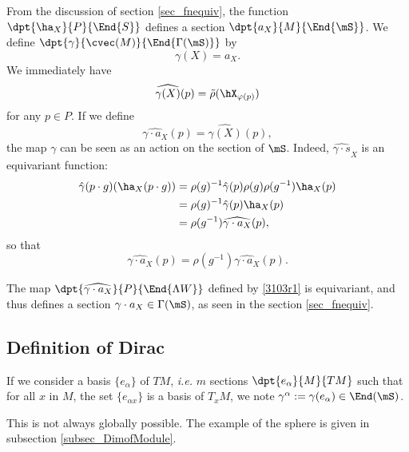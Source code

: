 From the discussion of section \ref{sec_fnequiv}, the function $\dpt{\ha_X}{P}{\End{S}}$ defines a section $\dpt{a_X}{M}{\End{\mS}}$. We define $\dpt{\gamma}{\cvec(M)}{\End{\Gamma(\mS)}}$ by
\begin{equation}		\label{EqDefgammax}
                       \gamma(X)=a_X.
\end{equation}
We immediately have
\[
                     \widehat{\gamma(X)}(p)=\tilde\rho(\hX_{\varphi(p)})
\]
for any $p\in P$. If we define
\begin{equation}\label{3103r1}
  \widehat{\gamma\cdot a_X}(p)=\widehat{\gamma(X)}(p),
\end{equation}
the map $\gamma$ can be seen as an action on the section of $\mS$. Indeed, $\widehat{\gamma\cdot s}_X$ is an equivariant function:
\begin{equation}
\begin{split}
 \hat{\gamma}(p\cdot g)(\ha_X(p\cdot g))
                  &=\rho(g)^{-1}\hat{\gamma}(p)\rho(g)\rho(g^{-1})\ha_X(p)\\
                  &=\rho(g)^{-1}\hat{\gamma}(p)\ha_X(p)\\
                  &=\rho(g^{-1})\widehat{\gamma\cdot a_X}(p),
\end{split}
\end{equation}
 so that
\[
    \widehat{\gamma\cdot a_X}(p)=\rho(g^{-1})\widehat{\gamma\cdot a_X}(p).
\]

The map $\dpt{\widehat{\gamma\cdot a_X}}{P}{\End{\Lambda W }}$ defined by \eqref{3103r1} is equivariant, and thus defines a section
$\gamma\cdot a_X\in\Gamma(\mS)$, as seen in the section \ref{sec_fnequiv}.

\subsection{Definition of Dirac}

If we consider a basis $\{e_{\alpha}\}$ of $TM$, \emph{i.e.} $m$ sections $\dpt{e_{\alpha}}{M}{TM}$ such that for all $x$ in $M$, the set $\{e_{\alpha x}\}$ is a basis of $T_xM$, we note $\gamma^{\alpha}:=\gamma(e_{\alpha})\in\End(\mS)$.

\begin{remark}  
This is not always globally possible. The example of the sphere is given in subsection \ref{subsec_DimofModule}. 
\label{rem_secnoglobal}
\end{remark}

